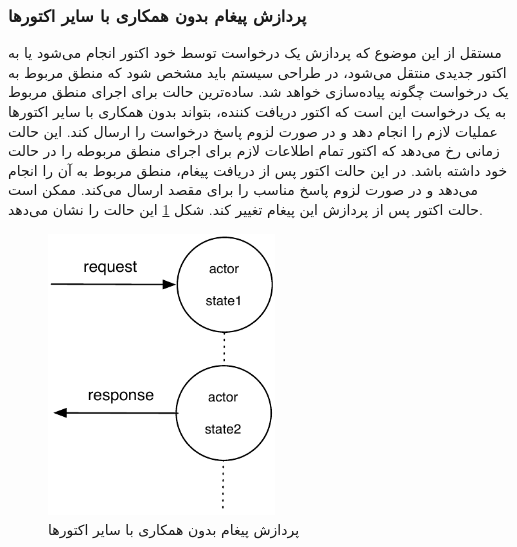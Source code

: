 \subsubsection{پردازش پیغام بدون همکاری با سایر اکتورها}
 مستقل از این موضوع که پردازش یک درخواست توسط خود اکتور انجام می‌شود یا به اکتور جدیدی منتقل می‌شود، در طراحی سیستم باید مشخص شود که منطق مربوط به یک درخواست چگونه پیاده‌سازی خواهد شد. ساده‌ترین حالت برای اجرای منطق مربوط به یک درخواست این است که اکتور دریافت کننده، بتواند بدون همکاری با سایر اکتورها عملیات لازم را انجام دهد و در صورت لزوم پاسخ درخواست را ارسال کند. این حالت زمانی رخ می‌دهد که اکتور تمام اطلاعات لازم برای اجرای منطق مربوطه را در حالت خود داشته باشد.
 در این حالت اکتور پس از دریافت پیغام، منطق مربوط به آن را انجام می‌دهد و در صورت لزوم پاسخ مناسب را برای مقصد ارسال می‌کند. ممکن است حالت اکتور پس از  پردازش این پیغام تغییر کند. شکل \ref{fig:no_collaboration} این حالت را نشان می‌دهد.
 \begin{figure}[h]
    \begin{center}
	\includegraphics[width=6cm]{4-ProposedFramework/Figures/NoCollaboration.pdf}
    \end{center}
    \caption{\label{fig:no_collaboration} پردازش پیغام بدون همکاری با سایر اکتورها}
\end{figure}

